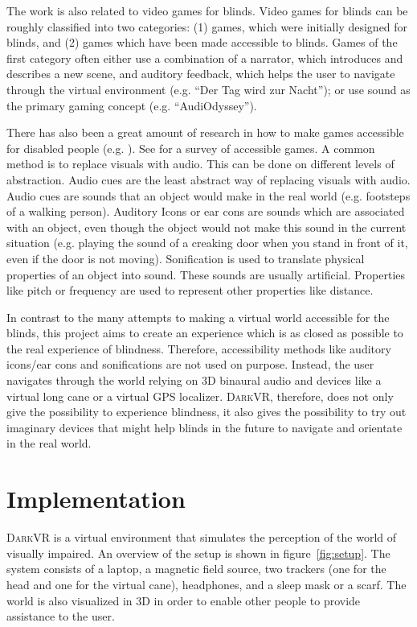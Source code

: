 \documentclass{sig-alternate}
\newcommand{\darkvr}{\textsc{DarkVR}\xspace}
\begin{document}
The work is also related to video games for blinds. Video games for blinds can
be roughly classified into two categories: (1) games, which were initially
designed for blinds, and (2) games which have been made accessible to blinds.
Games of the first category often either use a combination of a
narrator, which introduces and describes a new scene, and auditory feedback,
which helps the user to navigate through the virtual environment (e.g. ``Der Tag
wird zur Nacht''\cite{dertag}); or use sound as the primary gaming concept (e.g.
``AudiOdyssey''\cite{audiodyssey}).

There has also been a great amount of research in how to make games accessible
for disabled people (e.g. \cite{chile, terraformers, secondlife,
tankcommander}). See \cite{survey} for a survey of accessible games. A common
method is to replace visuals with audio. This can be done on different levels of
abstraction. Audio cues are the least abstract way of replacing visuals with
audio. Audio cues are sounds that an object would make in the real world (e.g.
footsteps of a walking person). Auditory Icons or ear cons are sounds which are
associated with an object, even though the object would not make this sound in
the current situation (e.g. playing the sound of a creaking door when you stand
in front of it, even if the door is not moving). Sonification is used to
translate physical properties of an object into sound. These sounds are usually
artificial. Properties like pitch or frequency are used to represent other
properties like distance.

In contrast to the many attempts to making a virtual world accessible for the
blinds, this project aims to create an experience which is as closed as
possible to the real experience of blindness. Therefore, accessibility methods
like auditory icons/ear cons and sonifications are not used on purpose. Instead,
the user navigates through the world relying on 3D binaural audio and devices
like a virtual long cane or a virtual GPS localizer. \darkvr, therefore,
does not only give the possibility to experience blindness, it also gives the
possibility to try out imaginary devices that might help blinds in the
future to navigate and orientate in the real world.

\section{Implementation}
\label{sec:method}
\darkvr is a virtual environment that simulates the perception of the
world of visually impaired. An overview of the setup is shown in
figure~\ref{fig:setup}. The system consists of a laptop, a magnetic field
source, two trackers (one for the head and one for the virtual cane),
headphones, and a sleep mask or a scarf. The world is also visualized in 3D in
order to enable other people to provide assistance to the user.
\end{document}
